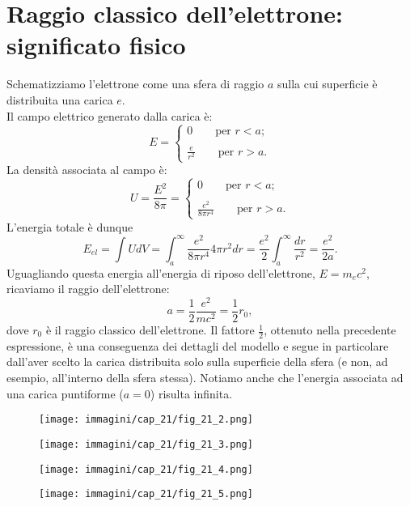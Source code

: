 \documentclass[a4paper,12pt,oneside]{book}
\begin{document}
\section[Raggio classico dell'elettrone]{Raggio classico dell'elettrone: significato fisico}
Schematizziamo l'elettrone come una sfera di raggio $a$ sulla cui superficie è distribuita una carica $e$.\\

Il campo elettrico generato dalla carica è:
\begin{equation}
E=\begin{cases}
0 \qquad \textrm{per }r<a;\\
\\
\displaystyle{\frac{e}{r^2}} \qquad \textrm{per }r>a.
\end{cases}
\end{equation}
La densità associata al campo è:
\begin{equation}
U=\frac{E^2}{8\pi}=\begin{cases}
0 \qquad \textrm{per }r<a;\\
\\
\displaystyle{\frac{e^2}{8\pi r^4}} \qquad \textrm{per }r>a.
\end{cases}
\end{equation}
L'energia totale è dunque
\begin{equation}
E_{el}=\int U dV = \int _a ^{\infty} \frac{e^2}{8\pi r^4} 4\pi r^2 dr = \frac{e^2}{2} \int _a ^{\infty} \frac{dr}{r^2}=\frac{e^2}{2a}. 
\end{equation}
Uguagliando questa energia all'energia di riposo dell'elettrone, $E=m_e c^2$, ricaviamo il raggio dell'elettrone:
\begin{equation}
a=\frac{1}{2}\frac{e^2}{mc^2}=\frac{1}{2} r_0,
\end{equation}
dove $r_0$ è il raggio classico dell'elettrone. Il fattore $\frac{1}{2}$, ottenuto nella precedente espressione, è una conseguenza dei dettagli del modello e segue in particolare dall'aver scelto la carica distribuita solo sulla superficie della sfera (e non, ad esempio, all'interno della sfera stessa). Notiamo anche che l'energia associata ad una carica puntiforme ($a=0$) risulta infinita.
\begin{figure}[!htbp]
\begin{center}
\texttt{[image: immagini/cap\_21/fig\_21\_2.png]}\\
\end{center}
\end{figure}
\begin{figure}[!htbp]
\begin{center}
\texttt{[image: immagini/cap\_21/fig\_21\_3.png]}\\
\end{center}
\end{figure}
\begin{figure}[!htbp]
\begin{center}
\texttt{[image: immagini/cap\_21/fig\_21\_4.png]}\\
\end{center}
\end{figure}
\begin{figure}[!htbp]
\begin{center}
\texttt{[image: immagini/cap\_21/fig\_21\_5.png]}
\end{center}
\end{figure}
\end{document}
